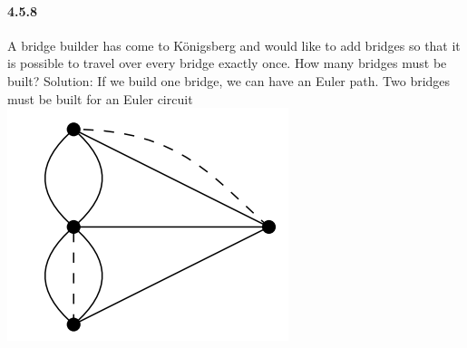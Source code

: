 \documentclass{article}
\begin{document}
\paragraph{4.5.8}
A bridge builder has come to Königsberg and would like to add bridges so that it is possible to travel over every bridge exactly once. How many bridges must be built?\newline
Solution:\newline
If we build one bridge, we can have an Euler path. Two bridges must be built for an Euler circuit\newline
\includegraphics{0088}
\end{document}

